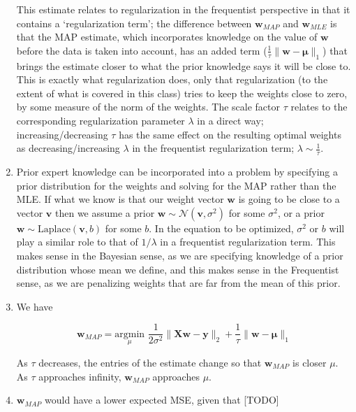 \documentclass[submit]{harvardml}
\begin{document}
\begin{enumerate}
This estimate relates to regularization in the frequentist perspective in that it contains a `regularization term';
the difference between $\mathbf{w}_{MAP}$ and $\mathbf{w}_{MLE}$ is that the MAP estimate, which incorporates knowledge on the 
value of $\mathbf{w}$ before the data is taken into account, has an added term ($\frac{1}{\tau}\|\mathbf{w}-\mathbf{\mu}\|_1$) that brings the estimate closer to what 
the prior knowledge says it will be close to. This is exactly what regularization does, only that regularization (to the extent of 
what is covered in this class) tries to keep the weights close to zero, by some measure of the norm of the weights.
The scale factor $\tau$ relates to the corresponding regularization parameter $\lambda$ in a direct way; increasing/decreasing
$\tau$ has the same effect on the resulting optimal weights as decreasing/increasing $\lambda$ in the frequentist regularization term; $\lambda \sim \frac{1}{\tau}$.

\item 

Prior expert knowledge can be incorporated into a problem by specifying a prior distribution for the weights
and solving for the MAP rather than the MLE. If what we know is that our weight vector $\mathbf{w}$ is going
to be close to a vector $\mathbf{v}$ then we assume a prior $\mathbf{w}\sim\mathcal{N}(\mathbf{v}, \sigma^2)$
for some $\sigma^2$, or a prior $\mathbf{w}\sim\mathrm{Laplace}(\mathbf{v}, b)$ for some $b$. In 
the equation to be optimized, $\sigma^2$ or $b$ will play a similar role to that of $1/\lambda$ in a frequentist
regularization term. This makes sense in the Bayesian sense, as we are specifying knowledge of a prior distribution whose mean we define, and this makes sense 
in the Frequentist sense, as we are penalizing weights that are far from the mean of this prior.

\item

We have

$$\mathbf{w}_{MAP} = \underset{\mu}{\mathrm{argmin}} \,\, \frac{1}{2\sigma^2}\|\mathbf{Xw}-\mathbf{y}\|_2 +\frac{1}{\tau}\|\mathbf{w}-\mathbf{\mu}\|_1$$

As $\tau$ decreases, the entries of the estimate change so that $\mathbf{w}_{MAP}$ is closer $\mu$.
As $\tau$ approaches infinity, $\mathbf{w}_{MAP}$ approaches $\mu$.
\item

$\mathbf{w}_{MAP}$ would have a lower expected MSE, given that [TODO]

\end{enumerate}
\end{document}
